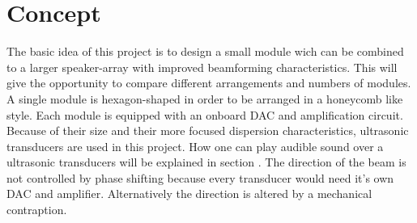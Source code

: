 \chapter{Concept}\label{sec:concept}


The basic idea of this project is to design a small module wich can be combined to a larger speaker-array with improved beamforming characteristics. This will give the opportunity to compare different arrangements and numbers of modules. A single module is hexagon-shaped in order to be arranged in a honeycomb like style. Each module is equipped with an onboard DAC and amplification circuit.\p
Because of their size and their more focused dispersion characteristics, ultrasonic transducers are used in this project. How one can play audible sound over a ultrasonic transducers will be explained in section .\p
The direction of the beam is not controlled by phase shifting because every transducer would need it's own DAC and amplifier. Alternatively the direction is altered by a mechanical contraption.